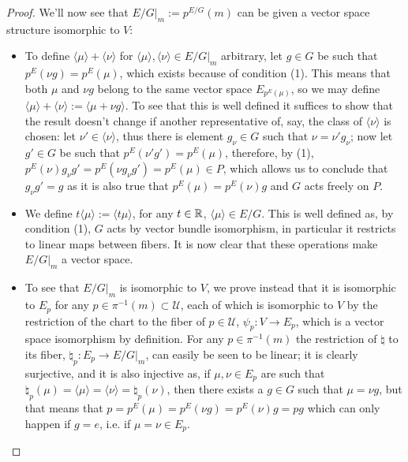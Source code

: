 \begin{proof}
We'll now see that $E/G|_m := p^{E/G}(m)$ can be given a vector space structure isomorphic to $V$:
\begin{itemize}
    \item To define $\langle \mu \rangle + \langle \nu \rangle$ for $\langle \mu \rangle, \langle \nu \rangle \in E/G|_m$ arbitrary, let $g \in G$ be such that $p^E(\nu g) = p^E(\mu)$, which exists because of condition (1). This means that both $\mu$ and $\nu g$ belong to the same vector space $E_{p^E(\mu)}$, so we may define $\langle \mu \rangle + \langle \nu \rangle := \langle \mu + \nu g \rangle$. To see that this is well defined it suffices to show that the result doesn't change if another representative of, say, the class of $\langle \nu \rangle$ is chosen: let $\nu' \in \langle \nu \rangle$, thus there is element $g_\nu \in G$ such that $\nu = \nu' g_\nu$; now let $g' \in G$ be such that $p^E(\nu' g') = p^E(\mu)$, therefore, by (1), $p^E(\nu) g_\nu g' = p^E(\nu g_\nu g') = p^E(\mu) \in P$, which allows us to conclude that $g_\nu g' = g$ as it is also true that $p^E(\mu) = p^E(\nu)g$ and $G$ acts freely on $P$.
    
    \item We define $t\langle\mu\rangle := \langle t \mu\rangle$, for any $t \in \mathbb{R}$, $\langle\mu\rangle \in E/G$. This is well defined as, by condition (1), $G$ acts by vector bundle isomorphism, in particular it restricts to linear maps between fibers. It is now clear that these operations make $E/G|_m$ a vector space.
    
    \item To see that $E/G|_m$ is isomorphic to $V$, we prove instead that it is isomorphic to $E_p$ for any $p \in \pi^{-1}(m) \subset \mathcal U$, each of which is isomorphic to $V$ by the restriction of the chart to the fiber of $p \in \mathcal U$, $\psi_p: V \to E_p$, which is a vector space isomorphism by definition. For any $p \in \pi^{-1}(m)$ the restriction of $\natural$ to its fiber, $\natural_p:E_p \to E/G|_m$, can easily be seen to be linear; it is clearly surjective, and it is also injective as, if $\mu, \nu \in E_p$ are such that $\natural_p(\mu) = \langle\mu\rangle = \langle\nu\rangle = \natural_p(\nu)$, then there exists a $g \in G$ such that $\mu = \nu g$, but that means that $p = p^E(\mu) = p^E(\nu g) = p^E(\nu)g = pg$ which can only happen if $g = e$, i.e. if $\mu = \nu \in E_p$.
\end{itemize}


\end{proof}
